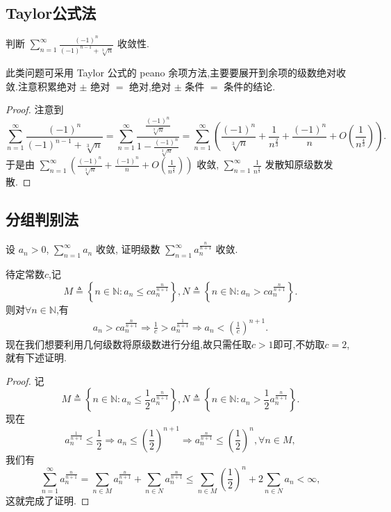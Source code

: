 \documentclass[../../main.tex]{subfiles}
\begin{document}
\subsection{Taylor公式法}

\begin{example}
判断 $\sum_{n=1}^{\infty} \frac{(-1)^n}{(-1)^{n - 1} + \sqrt[3]{n}}$ 收敛性.
\end{example}
\begin{note}
此类问题可采用 Taylor 公式的 peano 余项方法,主要要展开到余项的级数绝对收敛.注意积累绝对 $\pm$ 绝对 $=$ 绝对,绝对 $\pm$ 条件 $=$ 条件的结论.
\end{note}
\begin{proof}
注意到
\[
\sum_{n=1}^{\infty} \frac{(-1)^n}{(-1)^{n - 1} + \sqrt[3]{n}} = \sum_{n=1}^{\infty} \frac{\frac{(-1)^n}{\sqrt[3]{n}}}{1 - \frac{(-1)^n}{\sqrt[3]{n}}} = \sum_{n=1}^{\infty} \left( \frac{(-1)^n}{\sqrt[3]{n}} + \frac{1}{n^{\frac{2}{3}}} + \frac{(-1)^n}{n} + O \left( \frac{1}{n^{\frac{4}{3}}} \right) \right).
\]
于是由 $\sum_{n=1}^{\infty} \left( \frac{(-1)^n}{\sqrt[3]{n}} + \frac{(-1)^n}{n} + O \left( \frac{1}{n^{\frac{4}{3}}} \right) \right)$ 收敛, $\sum_{n=1}^{\infty} \frac{1}{n^{\frac{2}{3}}}$ 发散知原级数发散.

\end{proof}



\subsection{分组判别法}

\begin{example}
设 $a_n > 0$, $\sum_{n=1}^{\infty} a_n$ 收敛, 证明级数 $\sum_{n=1}^{\infty} a_n^{\frac{n}{n + 1}}$ 收敛.
\end{example}
\begin{note}
待定常数$c$,记
\[
M\triangleq \left\{ n\in \mathbb{N} :a_n\leqslant ca_{n}^{\frac{n}{n+1}} \right\} ,N\triangleq \left\{ n\in \mathbb{N} :a_n>ca_{n}^{\frac{n}{n+1}} \right\} .
\]
则对$\forall n\in \mathbb{N}$,有
\begin{align*}
a_n>ca_{n}^{\frac{n}{n+1}}\Rightarrow \frac{1}{c}>a_{n}^{\frac{1}{n+1}} \Rightarrow a_n<\left( \frac{1}{c} \right) ^{n+1}.
\end{align*}
现在我们想要利用几何级数将原级数进行分组,故只需任取$c>1$即可,不妨取$c=2$,就有下述证明.
\end{note}
\begin{proof}
记
\[
M \triangleq \left\{ n \in \mathbb{N} : a_n \leqslant \frac{1}{2} a_n^{\frac{n}{n + 1}} \right\}, N \triangleq \left\{ n \in \mathbb{N} : a_n > \frac{1}{2} a_n^{\frac{n}{n + 1}} \right\}.
\]
现在
\[
a_n^{\frac{1}{n + 1}} \leqslant \frac{1}{2} \Rightarrow a_n \leqslant \left( \frac{1}{2} \right)^{n + 1} \Rightarrow a_n^{\frac{n}{n + 1}} \leqslant \left( \frac{1}{2} \right)^n, \forall n \in M,
\]
我们有
\[
\sum_{n=1}^{\infty} a_n^{\frac{n}{n + 1}} = \sum_{n \in M} a_n^{\frac{n}{n + 1}} + \sum_{n \in N} a_n^{\frac{n}{n + 1}} \leqslant \sum_{n \in M} \left( \frac{1}{2} \right)^n + 2 \sum_{n \in N} a_n < \infty,
\]
这就完成了证明.

\end{proof}
\end{document}
